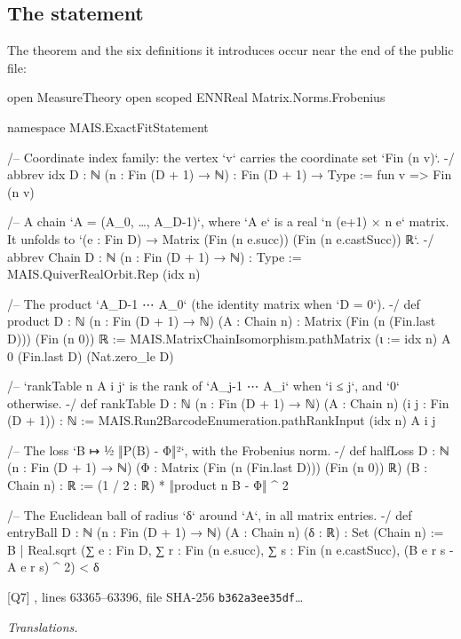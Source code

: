 \documentclass[11pt,a4paper]{article}
\newcommand{\leansource}[5]{{\footnotesize\raggedright\color{black!60}%
  [Q#1] \lean{#2}, lines #3--#4, file SHA-256 \texttt{#5}\ldots\par}\smallskip}
\theoremstyle{definition}
\theoremstyle{remark}
\numberwithin{equation}{section}
\begin{document}
\subsection{The statement}
The theorem and the six definitions it introduces occur near the end of the public file:
\begin{LeanCode}
open MeasureTheory
open scoped ENNReal Matrix.Norms.Frobenius

namespace MAIS.ExactFitStatement

/-- Coordinate index family: the vertex `v` carries the coordinate set `Fin (n v)`. -/
abbrev idx {D : ℕ} (n : Fin (D + 1) → ℕ) : Fin (D + 1) → Type :=
  fun v => Fin (n v)

/-- A chain `A = (A_0, …, A_{D-1})`, where `A e` is a real `n (e+1) × n e` matrix.
It unfolds to `(e : Fin D) → Matrix (Fin (n e.succ)) (Fin (n e.castSucc)) ℝ`. -/
abbrev Chain {D : ℕ} (n : Fin (D + 1) → ℕ) : Type :=
  MAIS.QuiverRealOrbit.Rep (idx n)

/-- The product `A_{D-1} ⋯ A_0` (the identity matrix when `D = 0`). -/
def product {D : ℕ} (n : Fin (D + 1) → ℕ) (A : Chain n) :
    Matrix (Fin (n (Fin.last D))) (Fin (n 0)) ℝ :=
  MAIS.MatrixChainIsomorphism.pathMatrix (ι := idx n) A 0 (Fin.last D) (Nat.zero_le D)

/-- `rankTable n A i j` is the rank of `A_{j-1} ⋯ A_i` when `i ≤ j`, and `0` otherwise. -/
def rankTable {D : ℕ} (n : Fin (D + 1) → ℕ) (A : Chain n) (i j : Fin (D + 1)) : ℕ :=
  MAIS.Run2BarcodeEnumeration.pathRankInput (idx n) A i j

/-- The loss `B ↦ ½ ‖P(B) - Φ‖²`, with the Frobenius norm. -/
def halfLoss {D : ℕ} (n : Fin (D + 1) → ℕ)
    (Φ : Matrix (Fin (n (Fin.last D))) (Fin (n 0)) ℝ) (B : Chain n) : ℝ :=
  (1 / 2 : ℝ) * ‖product n B - Φ‖ ^ 2

/-- The Euclidean ball of radius `δ` around `A`, in all matrix entries. -/
def entryBall {D : ℕ} (n : Fin (D + 1) → ℕ) (A : Chain n) (δ : ℝ) : Set (Chain n) :=
  {B | Real.sqrt (∑ e : Fin D, ∑ r : Fin (n e.succ), ∑ s : Fin (n e.castSucc),
      (B e r s - A e r s) ^ 2) < δ}
\end{LeanCode}
\leansource{7}{ExactFitFull_2026_10_28_UTC.lean}{63365}{63396}{b362a3ee35df}
\emph{Translations.}
\end{document}
